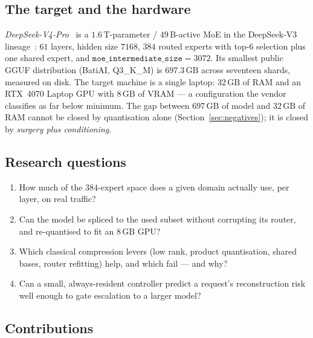 \documentclass[11pt]{article}
\newcommand{\code}[1]{\texttt{#1}}
\newcommand{\gb}{\,\textrm{GB}}
\begin{document}
\subsection{The target and the hardware}

\emph{DeepSeek-V4-Pro}~\cite{deepseekv4pro} is a $1.6\,\textrm{T}$-parameter /
$49\,\textrm{B}$-active MoE in the DeepSeek-V3
lineage~\cite{deepseekv3,dai2024deepseekmoe}: $61$ layers, hidden size $7168$,
$384$ routed experts with top-$6$ selection plus one shared expert, and
$\code{moe\_intermediate\_size}=3072$. Its smallest public GGUF distribution
(BatiAI, Q3\_K\_M) is $697.3\gb{}$ across seventeen shards, measured on disk.
The target machine is a single laptop: $32\gb{}$ of RAM and an RTX~4070 Laptop
GPU with $8\gb{}$ of VRAM --- a configuration the vendor classifies as far below
minimum. The gap between $697\gb{}$ of model and $32\gb{}$ of RAM cannot be
closed by quantisation alone (Section~\ref{sec:negatives}); it is closed by
\emph{surgery plus conditioning}.

\subsection{Research questions}

\begin{enumerate}[label=\textbf{RQ\arabic*.},leftmargin=3.2em]
  \item How much of the $384$-expert space does a given domain actually use,
        per layer, on real traffic?
  \item Can the model be spliced to the used subset without corrupting its
        router, and re-quantised to fit an $8\gb{}$ GPU?
  \item Which classical compression levers (low rank, product quantisation,
        shared bases, router refitting) help, and which fail --- and why?
  \item Can a small, always-resident controller predict a request's
        reconstruction risk well enough to gate escalation to a larger model?
\end{enumerate}

\subsection{Contributions}
\end{document}
